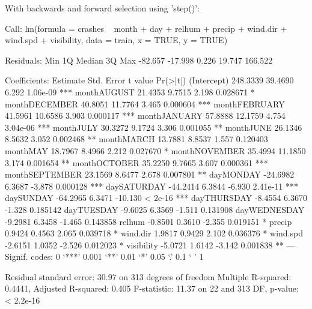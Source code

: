\documentclass[11pt, a4paper]{article}
\begin{document}
\begin{Schunk}
\begin{Soutput}
With backwards and forward selection using 'step()':
\end{Soutput}
\begin{Soutput}
Call:
lm(formula = crashes ~ month + day + relhum + precip + wind.dir + 
    wind.spd + visibility, data = train, x = TRUE, y = TRUE)

Residuals:
    Min      1Q  Median      3Q     Max 
-82.657 -17.998   0.226  19.747 166.522 

Coefficients:
               Estimate Std. Error t value Pr(>|t|)    
(Intercept)    248.3339    39.4690   6.292 1.06e-09 ***
monthAUGUST     21.4353     9.7515   2.198 0.028671 *  
monthDECEMBER   40.8051    11.7764   3.465 0.000604 ***
monthFEBRUARY   41.5961    10.6586   3.903 0.000117 ***
monthJANUARY    57.8888    12.1759   4.754 3.04e-06 ***
monthJULY       30.3272     9.1724   3.306 0.001055 ** 
monthJUNE       26.1346     8.5632   3.052 0.002468 ** 
monthMARCH      13.7881     8.8537   1.557 0.120403    
monthMAY        18.7967     8.4966   2.212 0.027670 *  
monthNOVEMBER   35.4994    11.1850   3.174 0.001654 ** 
monthOCTOBER    35.2250     9.7665   3.607 0.000361 ***
monthSEPTEMBER  23.1569     8.6477   2.678 0.007801 ** 
dayMONDAY      -24.6982     6.3687  -3.878 0.000128 ***
daySATURDAY    -44.2414     6.3844  -6.930 2.41e-11 ***
daySUNDAY      -64.2965     6.3471 -10.130  < 2e-16 ***
dayTHURSDAY     -8.4554     6.3670  -1.328 0.185142    
dayTUESDAY      -9.6025     6.3569  -1.511 0.131908    
dayWEDNESDAY    -9.2981     6.3458  -1.465 0.143858    
relhum          -0.8501     0.3610  -2.355 0.019151 *  
precip           0.9424     0.4563   2.065 0.039718 *  
wind.dir         1.9817     0.9429   2.102 0.036376 *  
wind.spd        -2.6151     1.0352  -2.526 0.012023 *  
visibility      -5.0721     1.6142  -3.142 0.001838 ** 
---
Signif. codes:  0 ‘***’ 0.001 ‘**’ 0.01 ‘*’ 0.05 ‘.’ 0.1 ‘ ’ 1

Residual standard error: 30.97 on 313 degrees of freedom
Multiple R-squared:  0.4441,	Adjusted R-squared:  0.405 
F-statistic: 11.37 on 22 and 313 DF,  p-value: < 2.2e-16
\end{Soutput}
\end{Schunk}
\end{document}
